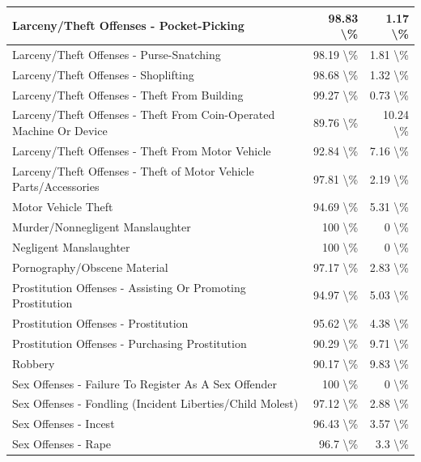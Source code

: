 \documentclass[
]{krantz}
\begin{document}
\begin{longtable}[t]{l|r|r}
\hline
Larceny/Theft Offenses - Pocket-Picking & 98.83 \textbackslash{}\% & 1.17 \textbackslash{}\%\\
\hline
Larceny/Theft Offenses - Purse-Snatching & 98.19 \textbackslash{}\% & 1.81 \textbackslash{}\%\\
\hline
Larceny/Theft Offenses - Shoplifting & 98.68 \textbackslash{}\% & 1.32 \textbackslash{}\%\\
\hline
Larceny/Theft Offenses - Theft From Building & 99.27 \textbackslash{}\% & 0.73 \textbackslash{}\%\\
\hline
Larceny/Theft Offenses - Theft From Coin-Operated Machine Or Device & 89.76 \textbackslash{}\% & 10.24 \textbackslash{}\%\\
\hline
Larceny/Theft Offenses - Theft From Motor Vehicle & 92.84 \textbackslash{}\% & 7.16 \textbackslash{}\%\\
\hline
Larceny/Theft Offenses - Theft of Motor Vehicle Parts/Accessories & 97.81 \textbackslash{}\% & 2.19 \textbackslash{}\%\\
\hline
Motor Vehicle Theft & 94.69 \textbackslash{}\% & 5.31 \textbackslash{}\%\\
\hline
Murder/Nonnegligent Manslaughter & 100 \textbackslash{}\% & 0 \textbackslash{}\%\\
\hline
Negligent Manslaughter & 100 \textbackslash{}\% & 0 \textbackslash{}\%\\
\hline
Pornography/Obscene Material & 97.17 \textbackslash{}\% & 2.83 \textbackslash{}\%\\
\hline
Prostitution Offenses - Assisting Or Promoting Prostitution & 94.97 \textbackslash{}\% & 5.03 \textbackslash{}\%\\
\hline
Prostitution Offenses - Prostitution & 95.62 \textbackslash{}\% & 4.38 \textbackslash{}\%\\
\hline
Prostitution Offenses - Purchasing Prostitution & 90.29 \textbackslash{}\% & 9.71 \textbackslash{}\%\\
\hline
Robbery & 90.17 \textbackslash{}\% & 9.83 \textbackslash{}\%\\
\hline
Sex Offenses - Failure To Register As A Sex Offender & 100 \textbackslash{}\% & 0 \textbackslash{}\%\\
\hline
Sex Offenses - Fondling (Incident Liberties/Child Molest) & 97.12 \textbackslash{}\% & 2.88 \textbackslash{}\%\\
\hline
Sex Offenses - Incest & 96.43 \textbackslash{}\% & 3.57 \textbackslash{}\%\\
\hline
Sex Offenses - Rape & 96.7 \textbackslash{}\% & 3.3 \textbackslash{}\%\\

\end{longtable}
\end{document}
